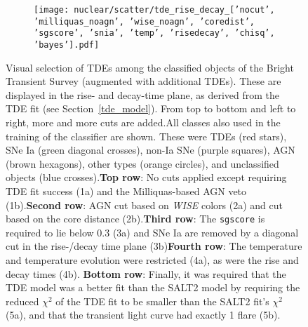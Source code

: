 \begin{figure}[htb]
\begin{subfigure}[b]{0.49\textwidth}
    \end{subfigure}
    \begin{subfigure}[b]{0.49\textwidth}
        \centering
        \texttt{[image: nuclear/scatter/tde\_rise\_decay\_['nocut', 'milliquas\_noagn', 'wise\_noagn', 'coredist', 'sgscore', 'snia', 'temp', 'risedecay', 'chisq', 'bayes'].pdf]}
    \end{subfigure}
    \caption[BTS selection]{Visual selection of TDEs among the classified objects of the Bright Transient Survey (augmented with additional TDEs). These are displayed in the rise- and decay-time plane, as derived from the TDE fit (see Section~\ref{tde_model}). From top to bottom and left to right, more and more cuts are added.\newline \newline All classes also used in the training of the classifier are shown. These were TDEs (red stars), SNe Ia (green diagonal crosses), non-Ia SNe (purple squares), AGN (brown hexagons), other types (orange circles), and unclassified objects (blue crosses).\newline \newline \textbf{Top row}: No cuts applied except requiring TDE fit success (1a) and the Milliquas-based AGN veto (1b).\newline \newline \textbf{Second row}: AGN cut based on \textit{WISE} colors (2a) and cut based on the core distance (2b).\newline \newline \textbf{Third row}: The \texttt{sgscore} is required to lie below 0.3 (3a) and SNe Ia are removed by a diagonal cut in the rise-/decay time plane (3b)\newline \newline \textbf{Fourth row}: The temperature and temperature evolution were restricted (4a), as were the rise and decay times (4b). \newline \newline \textbf{Bottom row}: Finally, it was required that the TDE model was a better fit than the SALT2 model by requiring the reduced $\chi^2$ of the TDE fit to be smaller than the SALT2 fit's $\chi^2$ (5a), and that the transient light curve had exactly 1 flare (5b).}
\end{figure}